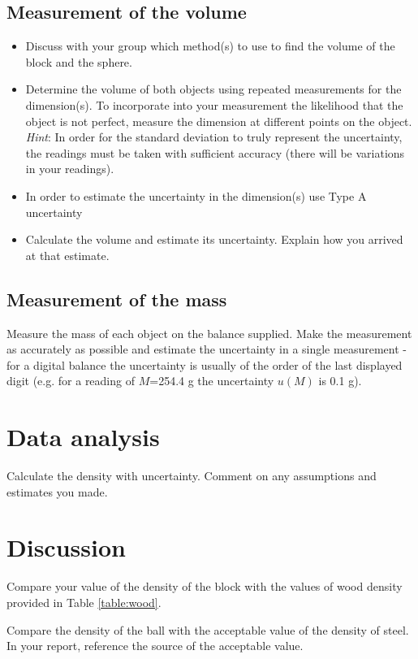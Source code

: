 \subsection{Measurement of the volume}
\begin{itemize}
\item
Discuss with your group which method(s) to use to find the volume of the block and the sphere.
\item
Determine the volume of both objects using repeated measurements for the dimension(s).  To incorporate into your measurement the likelihood that the object is not perfect, measure the dimension at different points on the object. \emph{Hint}: In order for the standard deviation to truly represent the uncertainty, the readings must be taken with sufficient accuracy (there will be variations in your readings).
\item
In order to estimate the uncertainty in the dimension(s) use Type A uncertainty 
\item
Calculate the volume and estimate its uncertainty. Explain how you arrived at that estimate.
\end{itemize}


\subsection{Measurement of the mass}
Measure the mass of each object on the balance supplied.  Make the measurement as accurately as possible and estimate the uncertainty in a single measurement - for a digital balance the uncertainty is usually of the order of the last displayed digit (e.g. for a reading of $M$=254.4 g the uncertainty $u(M)$ is 0.1 g). 

\section{Data analysis}
Calculate the density with uncertainty. Comment on any assumptions and estimates you made.

\section{Discussion}
Compare your value of the density of the block with the values of wood density provided in Table \ref{table:wood}. 

Compare the density of the ball with the acceptable value of the density of steel. In your report, reference the source of the acceptable value. 


